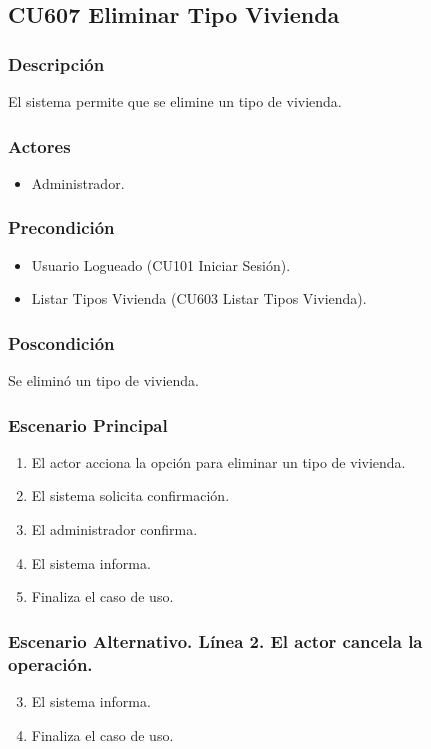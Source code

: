 \subsection{CU607 Eliminar Tipo Vivienda}
\subsubsection{Descripci\'{o}n}
El sistema permite que se elimine un tipo de vivienda.
\subsubsection{Actores}
\begin{itemize}
\item Administrador.
\end{itemize}
\subsubsection{Precondici\'{o}n}
\begin{itemize}
\item Usuario Logueado (CU101 Iniciar Sesi\'{o}n).
\item Listar Tipos Vivienda (CU603 Listar Tipos Vivienda).
\end{itemize}
\subsubsection{Poscondici\'{o}n}
Se elimin\'{o} un tipo de vivienda.
\subsubsection{Escenario Principal}
\begin{enumerate}
\item El actor acciona la opci\'{o}n para eliminar un tipo de vivienda.
\item El sistema solicita confirmaci\'{o}n.
\item El administrador confirma.
\item El sistema informa.
\item Finaliza el caso de uso.
\end{enumerate}
\subsubsection{Escenario Alternativo. L\'{i}nea 2. El actor cancela la operaci\'{o}n.}
\begin{enumerate}
\setcounter{enumi}{2}
\item El sistema informa.
\item Finaliza el caso de uso.
\end{enumerate}
